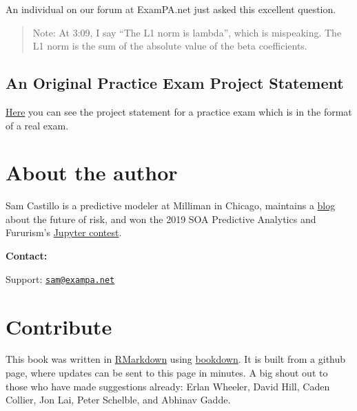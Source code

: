 \documentclass[openany]{book}
\begin{document}
An individual on our forum at ExamPA.net just asked this excellent question.

\begin{quote}
Note: At 3:09, I say ``The L1 norm is lambda'', which is mispeaking. The L1 norm is the sum of the absolute value of the beta coefficients.
\end{quote}

\hypertarget{an-original-practice-exam-project-statement}{%
\subsection{An Original Practice Exam Project Statement}\label{an-original-practice-exam-project-statement}}

\href{https://github.com/sdcastillo/JunePAFiles/blob/master/Practice\%20Exam\%20Sample.pdf}{Here} you can see the project statement for a practice exam which is in the format of a real exam.

\hypertarget{about-the-author}{%
\section{About the author}\label{about-the-author}}

Sam Castillo is a predictive modeler at Milliman in Chicago, maintains a \href{http://artificialactuary.com/}{blog} about the future of risk, and won the 2019 SOA Predictive Analytics and Fururism's \href{https://nbviewer.jupyter.org/github/SOASections/SOA-Predictive-Modeling-Innovation-and-Industry-Contest-2019-First-Place/blob/master/Predicting\%20Uncertainty\%20Prediction\%20Intervals\%20from\%20Gradient\%20Boosted\%20Quantile\%20Regression.ipynb}{Jupyter contest}.

\textbf{Contact:}

Support: \href{mailto:sam@exampa.net}{\nolinkurl{sam@exampa.net}}

\hypertarget{contribute}{%
\section{Contribute}\label{contribute}}

This book was written in \href{https://rmarkdown.rstudio.com/}{RMarkdown} using \href{https://bookdown.org/}{bookdown}. It is built from a github page, where updates can be sent to this page in minutes. A big shout out to those who have made suggestions already: Erlan Wheeler, David Hill, Caden Collier, Jon Lai, Peter Schelble, and Abhinav Gadde.
\end{document}
